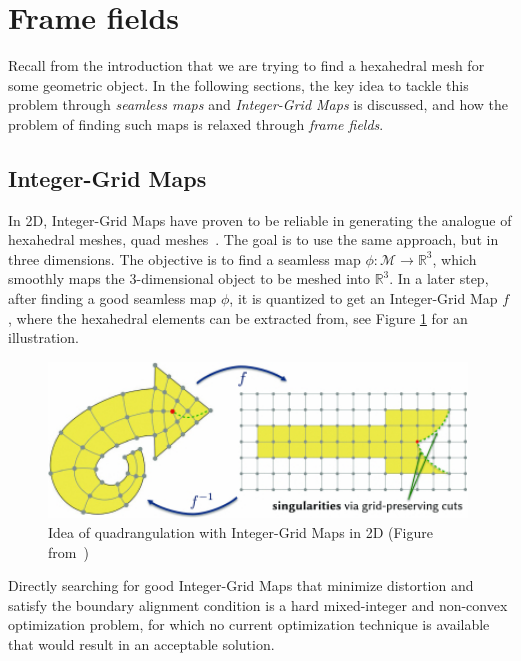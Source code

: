 \documentclass[../thesis.tex]{subfiles}
\begin{document}
\section{Frame fields}
Recall from the introduction that we are trying to find a hexahedral mesh
for some geometric object. In the following sections, the key idea to
tackle this problem through \emph{seamless maps} and \emph{Integer-Grid Maps} is discussed, and
how the problem of finding such maps is relaxed through \emph{frame fields}.
\subsection{Integer-Grid Maps}

In 2D, Integer-Grid Maps have proven to be reliable
in generating the analogue of hexahedral meshes, quad meshes~\cite{integer-grid}.
The goal is to use the same approach, but in three dimensions.
The objective is to find a seamless map
$\phi : \mathcal{M} \to \mathbb{R}^3$, which smoothly maps the $3$-dimensional object
to be meshed into $\mathbb{R}^3$.
In a later step, after finding a good seamless map $\phi$, it is quantized to get an
Integer-Grid Map $f$, where the hexahedral elements can be extracted from,  see Figure \ref{fig:integer-grid} for an illustration.
\begin{figure}[htb]
  \centering
  \includegraphics[width=30em]{figures/integer-grid-rough}
  \caption{Idea of quadrangulation with Integer-Grid Maps in 2D (Figure from~\cite{Hex22})}
  \label{fig:integer-grid}
\end{figure}
Directly searching for good Integer-Grid Maps that minimize distortion and satisfy the boundary alignment
condition is a hard mixed-integer and non-convex optimization problem, for which no current
optimization technique is available that would result in an acceptable solution.
\end{document}
